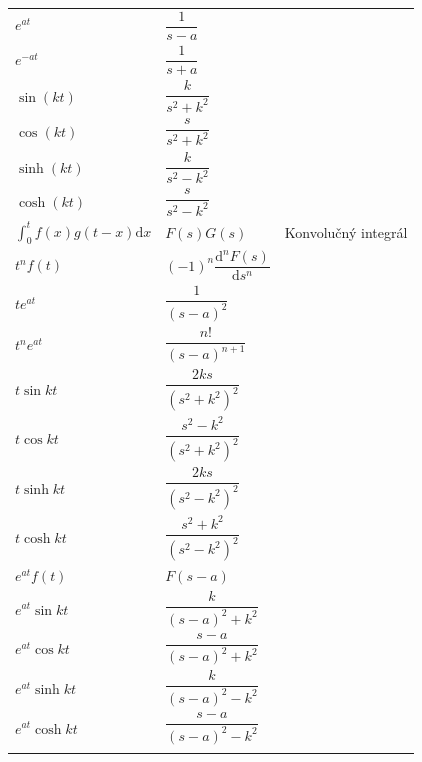 \documentclass[a4paper, 10pt, ]{article}
\begin{document}
\begin{longtable}[l]{p{3.7cm} @{} p{5.9cm} p{2.8cm}}
    
    $e^{at}$                                & $\dfrac{1}{s-a}$                      \\[4mm]
    $e^{-at}$                                & $\dfrac{1}{s+a}$                     \\[4mm]
    \midrule \addlinespace[4mm]


    $\sin(kt)$                               & $\dfrac{k}{s^2+k^2}$                  \\[4mm]
    $\cos(kt)$                               & $\dfrac{s}{s^2+k^2}$                  \\[4mm]
    $\sinh(kt)$                              & $\dfrac{k}{s^2-k^2}$                  \\[4mm]
    $\cosh(kt)$                              & $\dfrac{s}{s^2-k^2}$                  \\[4mm]
    \midrule \addlinespace[4mm]


    $\displaystyle{\int_0^t f(x)g(t-x) \text{d}x}$ & $F(s)G(s)$                     & {\color{Gray} \scriptsize Konvolučný integrál} \\[4mm]
    \midrule \addlinespace[4mm]


    $t^nf(t)$                               & $(-1)^n\dfrac{\text{d}^n F(s)}{\text{d} s^n}$ \\[4mm]
    $te^{at}$                               & $\dfrac{1}{(s-a)^2}$                  \\[4mm]
    $t^ne^{at}$                             & $\dfrac{n!}{(s-a)^{n+1}}$             \\[4mm]
    $t\sin kt$                              & $\dfrac{2ks}{(s^2+k^2)^2}$            \\[4mm]
    $t\cos kt$                              & $\dfrac{s^2-k^2}{(s^2+k^2)^2}$        \\[4mm]
    $t\sinh kt$                             & $\dfrac{2ks}{(s^2-k^2)^2}$            \\[4mm]
    $t\cosh kt$                             & $\dfrac{s^2+k^2}{(s^2-k^2)^2}$        \\[4mm]
    \midrule \addlinespace[4mm]

    
    $e^{at}f(t)$                            & $F(s-a)$                              \\[4mm]
    $e^{at}\sin kt$                         & $\dfrac{k}{(s-a)^2+k^2}$              \\[4mm]
    $e^{at}\cos kt$                         & $\dfrac{s-a}{(s-a)^2+k^2}$            \\[4mm]
    $e^{at}\sinh kt$                        & $\dfrac{k}{(s-a)^2-k^2}$              \\[4mm]
    $e^{at}\cosh kt$                        & $\dfrac{s-a}{(s-a)^2-k^2}$            \\[4mm]
    \midrule \addlinespace[4mm]



\end{longtable}
\end{document}
